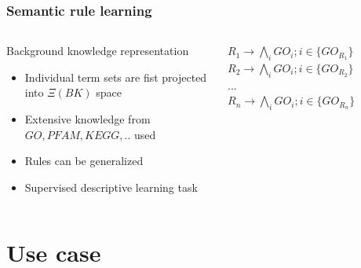 \documentclass{beamer}
\begin{document}
  \begin{frame}\frametitle{Semantic rule learning}

      \begin{columns}
    \begin{column}{0.5\textwidth}

  \begin{block}{Background knowledge representation}
    \begin{itemize}

    \item Individual term sets are fist projected into $\Xi(BK)$ space
    \item Extensive knowledge from $GO,PFAM, KEGG,..$ used
    \item Rules can be generalized
    \item Supervised descriptive learning task
      
    \end{itemize}
  \end{block}
      \end{column}
      \begin{column}{0.5\textwidth}  %
      \begin{center}
        $R_{1} \rightarrow \bigwedge_{i}GO_{i}; i \in \{GO_{R_{1}}\}$
        $R_{2} \rightarrow \bigwedge_{i}GO_{i}; i \in \{GO_{R_{2}}\}$\\
        $...$\\
        \medskip
        $R_{n} \rightarrow \bigwedge_{i}GO_{i}; i \in \{GO_{R_{n}}\}$
      \end{center}
    \end{column}
    \end{columns}

  \end{frame}
  \section{Use case}
\end{document}
